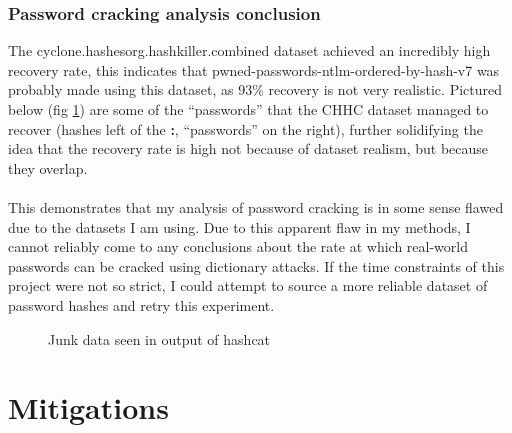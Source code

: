 \documentclass[11pt]{article}
\begin{document}
\subsubsection{Password cracking analysis conclusion}
The cyclone.hashesorg.hashkiller.combined dataset achieved an incredibly high recovery rate, this indicates that pwned-passwords-ntlm-ordered-by-hash-v7 was probably made using this dataset, as 93\% recovery is not very realistic.
Pictured below (fig \ref{fig:junk}) are some of the ``passwords'' that the CHHC dataset managed to recover (hashes left of the \textbf{:}, ``passwords'' on the right), further solidifying the idea that the recovery rate is high not because of dataset realism, but because they overlap.\\\\
This demonstrates that my analysis of password cracking is in some sense flawed due to the datasets I am using.
Due to this apparent flaw in my methods, I cannot reliably come to any conclusions about the rate at which real-world passwords can be cracked using dictionary attacks.
If the time constraints of this project were not so strict, I could attempt to source a more reliable dataset of password hashes and retry this experiment.
\begin{center}
\begin{figure}[h!]
 \caption{Junk data seen in output of hashcat} \label{fig:junk}
\end{figure}
\end{center}



\section{Mitigations} \label{MIT}
\end{document}
